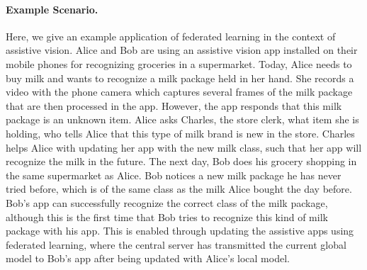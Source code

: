 \paragraph{Example Scenario.} Here, we give an example application of federated learning in the context of assistive vision. Alice and Bob are using an assistive vision app installed on their mobile phones for recognizing groceries in a supermarket. 
Today, 
Alice needs to buy milk and wants to recognize a milk package held in her hand. 
She records a video with the phone camera which captures several frames of the milk package that are then processed in the app. 
However, the app responds that this milk package is an unknown item.%
Alice asks Charles, the store clerk, what item she is holding, who tells Alice that this type of milk brand is new in the store. Charles helps Alice with updating her app with the new milk class, such that her app will recognize the milk in the future.   
The next day, Bob does his grocery shopping in the same supermarket as Alice. 
Bob notices a new milk package he has never tried %
before, which is of the same class as the milk Alice bought the day before. 
Bob's app can successfully recognize the correct class of the milk package, although this is the first time that Bob
tries to recognize this kind of milk package with his app. %
This is enabled through updating the assistive apps using federated learning, where the central server has transmitted the current global model to Bob's app after being updated with Alice's local model.   

